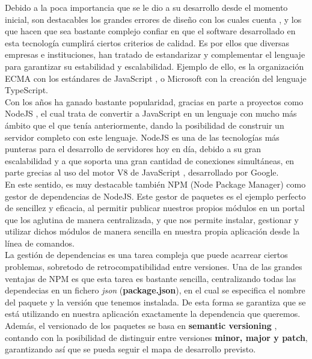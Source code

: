 Debido a la poca importancia que se le dio a su desarrollo desde el momento inicial, son destacables los grandes errores de diseño con los cuales cuenta \cite{KennethEng2019}, y los que hacen que sea bastante complejo confiar en que el software desarrollado en esta tecnología cumplirá ciertos criterios de calidad. Es por ellos que diversas empresas e instituciones, han tratado de estandarizar y complementar el lenguaje para garantizar su estabilidad y escalabilidad. Ejemplo de ello, es la organización ECMA con los estándares de JavaScript \cite{ecmascript}, o Microsoft con la creación del lenguaje TypeScript.\\

Con los años ha ganado bastante popularidad, gracias en parte a proyectos como NodeJS \cite{node}, el cual trata de convertir a JavaScript en un lenguaje con mucho más ámbito que el que tenía anteriormente, dando la posibilidad de construir un servidor completo con este lenguaje. NodeJS es una de las tecnologías más punteras para el desarrollo de servidores hoy en día, debido a su gran escalabilidad y a que soporta una gran cantidad de conexiones simultáneas, en parte grecias al uso del motor V8 de JavaScript \cite{motor-v8}, desarrollado por Google. \\

En este sentido, es muy destacable también NPM (Node Package Manager) \cite{npm} como gestor de dependencias de NodeJS. Este gestor de paquetes es el ejemplo perfecto de sencillez y eficacia, al permitir publicar nuestros propios módulos en un portal que los aglutina de manera centralizada, y que nos permite instalar, gestionar y utilizar dichos módulos de manera sencilla en nuestra propia aplicación desde la línea de comandos. \\

La gestión de dependencias es una tarea compleja que puede acarrear ciertos problemas, sobretodo de retrocompatibilidad entre versiones. Una de las grandes ventajas de NPM es que esta tarea es bastante sencilla, centralizando todas las dependecias en un fichero \textit{json} (\textbf{package.json}), en el cual se especifica el nombre del paquete y la versión que tenemos instalada. De esta forma se garantiza que se está utilizando en nuestra aplicación exactamente la dependencia que queremos. \\

Además, el versionado de los paquetes se basa en \textbf{semantic versioning} \cite{semver}, contando con la posibilidad de distinguir entre versiones \textbf{minor, major y patch}, garantizando así que se pueda seguir el mapa de desarrollo previsto. \\

